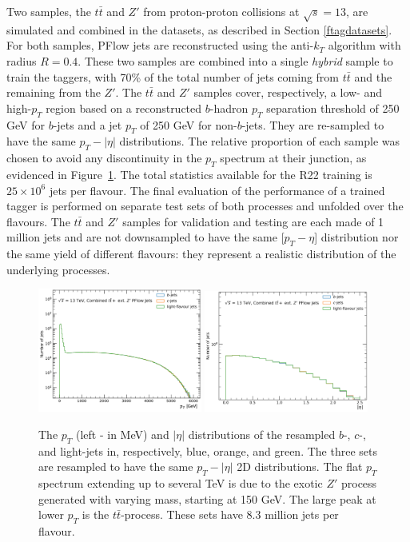 Two samples, the $t\bar{t}$ and $Z'$ from proton-proton collisions at $\sqrt{s} = 13$, are simulated and combined in the datasets, as described in Section \ref{ftagdatasets}. For both samples, PFlow jets are reconstructed using the anti-$k_T$ algorithm with radius $R = 0.4$. These two samples are combined into a single \textit{hybrid} sample to train the taggers, with 70\% of the total number of jets coming from $t\bar{t}$ and the remaining from the $Z'$. The $t\bar{t}$ and $Z'$ samples cover, respectively, a low- and high-$p_T$ region based on a reconstructed $b$-hadron $p_T$ separation threshold of 250 GeV for $b$-jets and a jet $p_T$ of 250 GeV for non-$b$-jets. They are re-sampled to have the same $p_T-|\eta|$ distributions. The relative proportion of each sample was chosen to avoid any discontinuity in the $p_T$ spectrum at their junction, as evidenced in Figure~\ref{fig:distTraining}. The total statistics available for the R22 training is $25 \times 10^{6}$ jets per flavour. The final evaluation of the performance of a trained tagger is performed on separate test sets of both processes and unfolded over the flavours. The $t\bar{t}$ and $Z'$ samples for validation and testing are each made of 1 million jets and are not downsampled to have the same [$p_T - \eta$] distribution nor the same yield of different flavours: they represent a realistic distribution of the underlying processes. \\

\begin{figure}[h!]
  \center
  \includegraphics[width=0.48\textwidth]{Images/FTAG/DL1d/ptdist.png}
  \includegraphics[width=0.48\textwidth]{Images/FTAG/DL1d/etadist.png}
  \caption{The $p_T$ (left - in MeV) and $|\eta|$ distributions of the resampled $b$-, $c$-, and light-jets in, respectively, blue, orange, and green. The three sets are resampled to have the same $p_T-|\eta|$ 2D distributions. The flat $p_T$ spectrum extending up to several TeV is due to the exotic $Z'$ process generated with varying mass, starting at 150 GeV. The large peak at lower $p_T$ is the $t\bar{t}$-process. These sets have 8.3 million jets per flavour.} 
  \label{fig:distTraining}
\end{figure}

